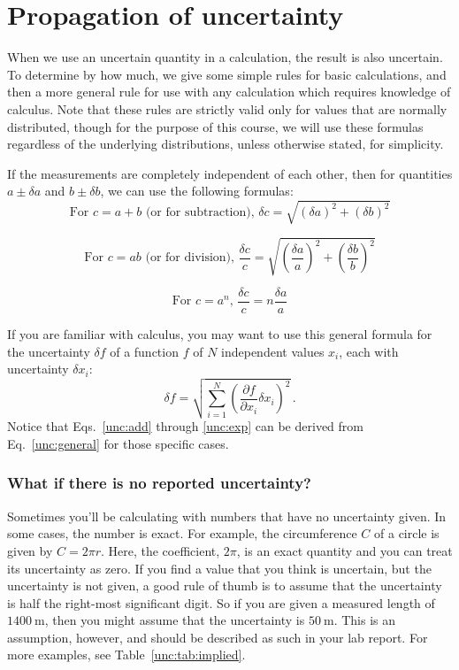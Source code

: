 \section{Propagation of uncertainty}

When we use an uncertain quantity in a calculation, the result is also uncertain. To determine by how much, we give some simple rules for basic calculations, and then a more general rule for use with any calculation which requires knowledge of calculus. Note that these rules are strictly valid only for values that are normally distributed, though for the purpose of this course, we will use these formulas regardless of the underlying distributions, unless otherwise stated, for simplicity.

If the measurements are completely independent of each other, then for quantities $a \pm \delta a$ and $b \pm \delta b$, we can use the following formulas:
\begin{equation}\label{unc:add}
\textrm{For } c = a + b \textrm{ (or for subtraction), } \delta c = \sqrt{(\delta a)^2 + (\delta b)^2}
\end{equation}

\begin{equation}\label{unc:mult}
\textrm{For } c = ab \textrm{ (or for division), } \frac{\delta c}{c} = \sqrt{\left(\frac{\delta a}{a}\right)^2 + \left(\frac{\delta b}{b}\right)^2}
\end{equation}

\begin{equation}\label{unc:exp}
\textrm{For } c = a^n,\, \frac{\delta c}{c} = n \frac{\delta a}{a}
\end{equation}

If you are familiar with calculus, you may want to use this general formula for the uncertainty $\delta f$ of a function $f$ of $N$ independent values $x_i$, each with uncertainty $\delta x_i$:
\begin{equation}\label{unc:general}
\delta f = \sqrt{ \sum_{i=1}^{N} \left(\frac{\partial f}{\partial x_i} \delta x_i\right)^2 } \, .
\end{equation}
Notice that Eqs.\ \ref{unc:add} through \ref{unc:exp} can be derived from Eq.\ \ref{unc:general} for those specific cases.

\subsubsection{What if there is no reported uncertainty?}

Sometimes you'll be calculating with numbers that have no uncertainty given.
In some cases, the number is exact.
For example, the circumference $C$ of a circle is given by $C = 2 \pi r$. Here, the coefficient, $2\pi$, is an exact quantity and you can treat its uncertainty as zero.
If you find a value that you think is uncertain, but the uncertainty is not given, a good rule of thumb is to assume that the uncertainty is half the right-most significant digit.
So if you are given a measured length of $1400\:$m, then you might assume that the uncertainty is $50\:$m.
This is an assumption, however, and should be described as such in your lab report.
For more examples, see Table~\ref{unc:tab:implied}.

